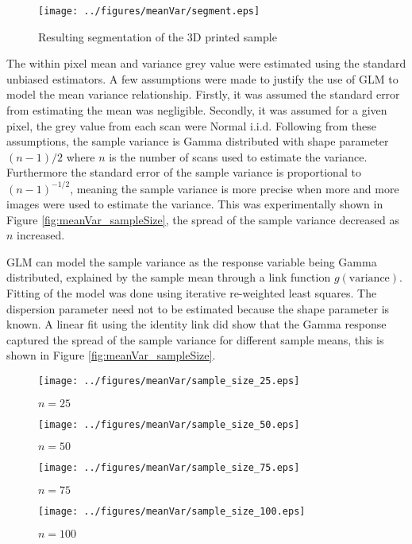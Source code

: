 \documentclass[a4paper]{proc}
\begin{document}
\begin{figure}
	\centering
	\texttt{[image: ../figures/meanVar/segment.eps]}
	\caption{Resulting segmentation of the 3D printed sample}
	\label{fig:segment}
\end{figure}

The within pixel mean and variance grey value were estimated using the standard unbiased estimators. A few assumptions were made to justify the use of GLM to model the mean variance relationship. Firstly, it was assumed the standard error from estimating the mean was negligible. Secondly, it was assumed for a given pixel, the grey value from each scan were Normal i.i.d. Following from these assumptions, the sample variance is Gamma distributed with shape parameter $(n-1)/2$ where $n$ is the number of scans used to estimate the variance. Furthermore the standard error of the sample variance is proportional to $(n-1)^{-1/2}$, meaning the sample variance is more precise when more and more images were used to estimate the variance. This was experimentally shown in Figure \ref{fig:meanVar_sampleSize}, the spread of the sample variance decreased as $n$ increased.

GLM can model the sample variance as the response variable being Gamma distributed, explained by the sample mean through a link function $g(\text{variance})$. Fitting of the model was done using iterative re-weighted least squares. The dispersion parameter need not to be estimated because the shape parameter is known. A linear fit using the identity link did show that the Gamma response captured the spread of the sample variance for different sample means, this is shown in Figure \ref{fig:meanVar_sampleSize}.

\begin{figure*}
	\centering
	\begin{subfigure}{0.45\textwidth}
		\centering
		\texttt{[image: ../figures/meanVar/sample\_size\_25.eps]}
		\caption{$n=25$}
	\end{subfigure}
	\begin{subfigure}{0.45\textwidth}
		\centering
		\texttt{[image: ../figures/meanVar/sample\_size\_50.eps]}
		\caption{$n=50$}
	\end{subfigure}
	\begin{subfigure}{0.45\textwidth}
		\centering
		\texttt{[image: ../figures/meanVar/sample\_size\_75.eps]}
		\caption{$n=75$}
	\end{subfigure}
	\begin{subfigure}{0.45\textwidth}
		\centering
		\texttt{[image: ../figures/meanVar/sample\_size\_100.eps]}
		\caption{$n=100$}
	\end{subfigure}
	\caption{Mean and variance frequency density plot of each pixel's grey value in the segmented image of the 3D printed sample. The sample variance and sample mean were estimated using $n$ scans selected at random without replacement. A Gamma GLM was fitted with the identity link. The solid and dotted lines are the mean response and the $\Phi(\pm 1)$ quantiles respectively.}
	\label{fig:meanVar_sampleSize}
\end{figure*}
\end{document}
